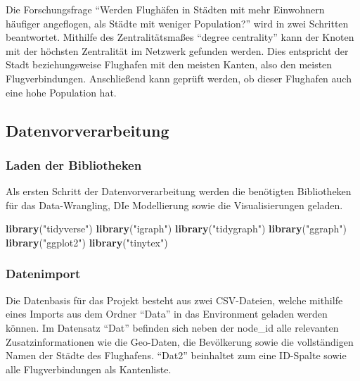 \documentclass[]{article}
\newenvironment{Shaded}{\begin{snugshade}}{\end{snugshade}}
\newcommand{\KeywordTok}[1]{\textcolor[rgb]{0.13,0.29,0.53}{\textbf{#1}}}
\newcommand{\NormalTok}[1]{#1}
\newcommand{\StringTok}[1]{\textcolor[rgb]{0.31,0.60,0.02}{#1}}
\begin{document}
Die Forschungsfrage ``Werden Flughäfen in Städten mit mehr Einwohnern
häufiger angeflogen, als Städte mit weniger Population?'' wird in zwei
Schritten beantwortet. Mithilfe des Zentralitätsmaßes ``degree
centrality'' kann der Knoten mit der höchsten Zentralität im Netzwerk
gefunden werden. Dies entspricht der Stadt beziehungsweise Flughafen mit
den meisten Kanten, also den meisten Flugverbindungen. Anschließend kann
geprüft werden, ob dieser Flughafen auch eine hohe Population hat.

\hypertarget{datenvorverarbeitung}{%
\subsection{Datenvorverarbeitung}\label{datenvorverarbeitung}}

\hypertarget{laden-der-bibliotheken}{%
\subsubsection{Laden der Bibliotheken}\label{laden-der-bibliotheken}}

Als ersten Schritt der Datenvorverarbeitung werden die benötigten
Bibliotheken für das Data-Wrangling, DIe Modellierung sowie die
Visualisierungen geladen.

\begin{Shaded}
\begin{Highlighting}[]
\KeywordTok{library}\NormalTok{(}\StringTok{"tidyverse"}\NormalTok{)}
\KeywordTok{library}\NormalTok{(}\StringTok{"igraph"}\NormalTok{) }
\KeywordTok{library}\NormalTok{(}\StringTok{"tidygraph"}\NormalTok{) }
\KeywordTok{library}\NormalTok{(}\StringTok{"ggraph"}\NormalTok{)}
\KeywordTok{library}\NormalTok{(}\StringTok{"ggplot2"}\NormalTok{)}
\KeywordTok{library}\NormalTok{(}\StringTok{"tinytex"}\NormalTok{)}
\end{Highlighting}
\end{Shaded}

\hypertarget{datenimport}{%
\subsubsection{Datenimport}\label{datenimport}}

Die Datenbasis für das Projekt besteht aus zwei CSV-Dateien, welche
mithilfe eines Imports aus dem Ordner ``Data'' in das Environment
geladen werden können. Im Datensatz ``Dat'' befinden sich neben der
node\_id alle relevanten Zusatzinformationen wie die Geo-Daten, die
Bevölkerung sowie die vollständigen Namen der Städte des Flughafens.
``Dat2'' beinhaltet zum eine ID-Spalte sowie alle Flugverbindungen als
Kantenliste.
\end{document}

